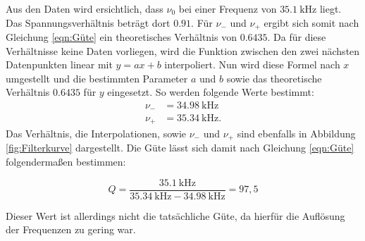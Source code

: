 Aus den Daten wird ersichtlich, dass $\nu_0$ bei einer Frequenz von $\SI{35.1}{\kilo\hertz}$ liegt.
Das Spannungsverhältnis beträgt dort $0.91$.
Für $\nu_-$ und $\nu_+$ ergibt sich somit nach Gleichung \eqref{eqn:Güte} ein theoretisches Verhältnis von $\num{0.6435}$.
Da für diese Verhältnisse keine Daten vorliegen, wird die Funktion zwischen den zwei nächsten Datenpunkten linear mit $y=ax+b$ interpoliert.
Nun wird diese Formel nach $x$ umgestellt und die bestimmten Parameter $a$ und $b$ sowie das theoretische Verhältnis $\num{0.6435}$ für $y$ eingesetzt.
So werden folgende Werte bestimmt:
\begin{align*}
  \nu_- &= \SI{34.98}{\kilo\hertz} \\
  \nu_+ &= \SI{35.34}{\kilo\hertz} .
\end{align*}
Das Verhältnis, die Interpolationen, sowie $\nu_-$ und $\nu_+$ sind ebenfalls in Abbildung \ref{fig:Filterkurve} dargestellt. 
Die Güte lässt sich damit nach Gleichung \eqref{eqn:Güte} folgendermaßen bestimmen:

\begin{equation*}
  Q = \frac{\SI{35.1}{\kilo\hertz}}{\SI{35.34}{\kilo\hertz} - \SI{34.98}{\kilo\hertz}} = 97,5
\end{equation*}

Dieser Wert ist allerdings nicht die tatsächliche Güte, da hierfür die Auflösung der Frequenzen zu gering war.

